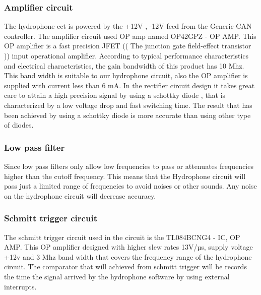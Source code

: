 \subsubsection{Amplifier circuit }
The hydrophone cct is powered by the +12V , -12V feed from the Generic CAN controller. The amplifier circuit used OP amp named OP42GPZ - OP AMP. This OP amplifier is a fast precision JFET (( The junction gate field-effect transistor )) input operational amplifier.
According to typical performance characteristics and electrical characteristics, the gain bandwidth of this product has 10 Mhz. This band width is suitable to our hydrophone circuit, also the OP amplifier is supplied with current less than 6 mA.
In the rectifier circuit design it takes great care to attain a high precision signal by using a schottky diode ,  that is characterized by a low voltage drop and fast switching time.
The result that has been achieved by using a schottky diode is more accurate than using other type of diodes.  

\subsubsection{Low pass filter}
Since low pass filters only allow low frequencies to pass or attenuates frequencies higher than the cutoff frequency.
This means that the Hydrophone circuit will pass just a limited range of frequencies to avoid noises or other sounds. Any noise on the hydrophone circuit will decrease accuracy.    
 
 \subsubsection{Schmitt trigger  circuit}
The schmitt trigger circuit used in the circuit is the TL084BCNG4 - IC, OP AMP. This OP amplifier designed with higher slew rates 13V/µs, supply voltage +12v and 3 Mhz band width that covers the frequency range of the hydrophone circuit.
The comparator that will achieved from schmitt trigger will be records the time the signal arrived by the hydrophone software by using external interrupts.
 

